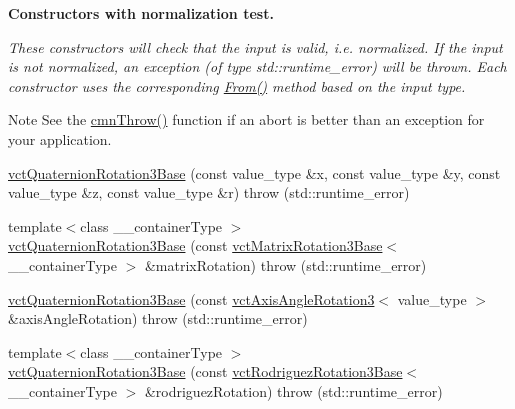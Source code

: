 \begin{Indent}{\bf Constructors with normalization test.}\par
{\em These constructors will check that the input is valid, i.\-e. normalized. If the input is not normalized, an exception (of type {\ttfamily std\-::runtime\-\_\-error}) will be thrown. Each constructor uses the corresponding \hyperlink{classvct_quaternion_rotation3_base_a24fb234e60ece7a6b04f6f53339f38fe}{From()} method based on the input type.

\begin{DoxyNote}{Note}
See the \hyperlink{_minimal_cmn_8h_ad50e82cf9c9dbd0e6443c13e0d1a6f1a}{cmn\-Throw()} function if an {\ttfamily abort} is better than an exception for your application. 
\end{DoxyNote}
}\begin{DoxyCompactItemize}
\item 
\hyperlink{classvct_quaternion_rotation3_base_ae39ee6bfd8b77e8e6b6b9ed4018822d3}{vct\-Quaternion\-Rotation3\-Base} (const value\-\_\-type \&x, const value\-\_\-type \&y, const value\-\_\-type \&z, const value\-\_\-type \&r)  throw (std\-::runtime\-\_\-error)
\item 
{\footnotesize template$<$class \-\_\-\-\_\-container\-Type $>$ }\\\hyperlink{classvct_quaternion_rotation3_base_a505f35ee8b57e613635d603cda8fd2ef}{vct\-Quaternion\-Rotation3\-Base} (const \hyperlink{classvct_matrix_rotation3_base}{vct\-Matrix\-Rotation3\-Base}$<$ \-\_\-\-\_\-container\-Type $>$ \&matrix\-Rotation)  throw (std\-::runtime\-\_\-error)
\item 
\hyperlink{classvct_quaternion_rotation3_base_a2d5c41c767010bc9b7542841fdeb5dce}{vct\-Quaternion\-Rotation3\-Base} (const \hyperlink{classvct_axis_angle_rotation3}{vct\-Axis\-Angle\-Rotation3}$<$ value\-\_\-type $>$ \&axis\-Angle\-Rotation)  throw (std\-::runtime\-\_\-error)
\item 
{\footnotesize template$<$class \-\_\-\-\_\-container\-Type $>$ }\\\hyperlink{classvct_quaternion_rotation3_base_a1faf412df8da0e58bdf71ee5fd6047dd}{vct\-Quaternion\-Rotation3\-Base} (const \hyperlink{classvct_rodriguez_rotation3_base}{vct\-Rodriguez\-Rotation3\-Base}$<$ \-\_\-\-\_\-container\-Type $>$ \&rodriguez\-Rotation)  throw (std\-::runtime\-\_\-error)
\end{DoxyCompactItemize}
\end{Indent}
